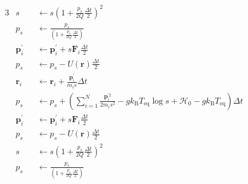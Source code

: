 \begin{alignat}{3}
  &s &&\gets
  s \left(1 + \frac{p_{s}}{2Q} \frac{\Delta t}{2}\right)^{2}
  \\
  &p_{s} &&\gets
  \frac{p_{s}}{\left(1 + \frac{p_{s}}{2Q} \frac{\Delta t}{2}\right)}
  \\
  &\bm{p}_{i}^{\prime} &&\gets
  \bm{p}_{i}^{\prime} + s \bm{F}_{i} \frac{\Delta t}{2}
  \\
  &p_{s} &&\gets
  p_{s} - U(\bm{r}) \frac{\Delta t}{2}
  \\
  &\bm{r}_{i} &&\gets
  \bm{r}_{i} + \frac{\bm{p}_{i}^{\prime}}{m_{i}s} \Delta t
  \\
  &p_{s} &&\gets
  p_{s} +
  \left(
    \sum_{i=1}^{N}
    \frac{\bm{p}_{i}^{\prime 2}}{2m_{i}s^{2}}
    -
    g k_{\mathrm{B}} T_{\mathrm{eq}} \log s
    +
    \mathcal{H}_{0}
    -
    g k_{\mathrm{B}} T_{\mathrm{eq}}
  \right)
  \Delta t
  \\
  &\bm{p}_{i}^{\prime} &&\gets
  \bm{p}_{i}^{\prime} + s \bm{F}_{i} \frac{\Delta t}{2}
  \\
  &p_{s} &&\gets
  p_{s} - U(\bm{r}) \frac{\Delta t}{2}
  \\
  &s &&\gets
  s \left(1 + \frac{p_{s}}{2Q} \frac{\Delta t}{2}\right)^{2}
  \\
  &p_{s} &&\gets
  \frac{p_{s}}{\left(1 + \frac{p_{s}}{2Q} \frac{\Delta t}{2}\right)}
\end{alignat}

